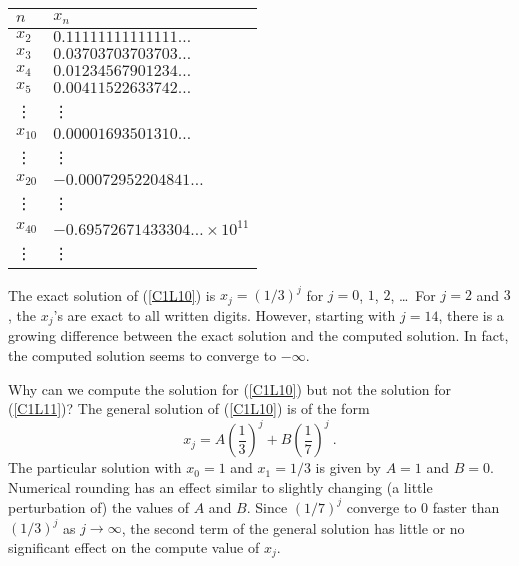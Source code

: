 \begin{longtable}{l|l}
\hline
$n$ & $x_n$ \\
\hline
$x_2$ & $0.11111111111111\ldots$ \\
$x_3$ & $0.03703703703703\ldots$ \\
$x_4$ & $0.01234567901234\ldots$ \\
$x_5$ & $0.00411522633742\ldots$ \\
\vdots & \qquad \vdots \\
$x_{10}$ & $0.00001693501310\ldots$ \\
\vdots & \qquad \vdots \\
$x_{20}$ & $-0.00072952204841\ldots$ \\
\vdots & \qquad \vdots \\
$x_{40}$ & $-0.69572671433304\ldots \times 10^{11}$ \\
\vdots & \qquad \vdots \\
\hline
\end{longtable}


The exact solution of (\ref{C1L10}) is $x_j = (1/3)^j$ for
$j=0$, $1$, $2$, \ldots\  For $j=2$ and $3$, the $x_j$'s are exact to
all written digits.  However, starting with $j=14$, there is a growing
difference between the exact solution and the computed solution.  In
fact, the computed solution seems to converge to $-\infty$.

Why can we compute the solution for (\ref{C1L10}) but not
the solution for (\ref{C1L11})?  The general solution of
(\ref{C1L10}) is of the form
\[
x_j = A \left(\frac{1}{3}\right)^j + B \left(\frac{1}{7}\right)^j \ .
\]
The particular solution with $x_0=1$ and $x_1 = 1/3$ is given
by $A=1$ and $B=0$.  Numerical rounding has an effect similar to
slightly changing (a little perturbation of) the values of $A$ and
$B$. Since $(1/7)^j$ converge to $0$ faster than $(1/3)^j$ as
$j\rightarrow \infty$, the second term of the general solution has
little or no significant effect on the compute value of $x_j$.

